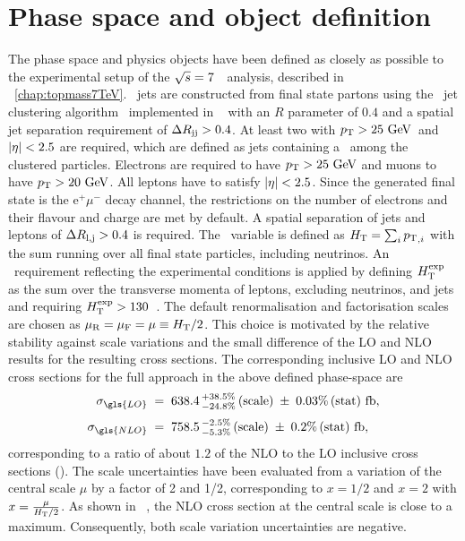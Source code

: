 \section{Phase space and object definition}
%
The phase space and physics objects have been defined as closely as possible to the experimental setup of the ${\sqrt{s}}=7$~\TeV\ analysis, described in \chap~\ref{chap:topmass7TeV}.
%
\Genlevel\ jets are constructed from final state partons using the \antikt\ jet clustering algorithm~\cite{CAC-0801} implemented in \Fastjet~\cite{Cacciari:2011ma} with an $R$ parameter of $0.4$ and a spatial jet separation requirement of $\Delta R_\mathrm{jj}>0.4$. At least two  with $p_\mathrm{T}>25~\mathrm{GeV}$\ and $|\eta|<2.5$ are required, which are defined as jets containing a \bquark\ among the clustered particles. 
%
Electrons are required to have $p_\mathrm{T}>25~\mathrm{GeV}$ and muons to have $p_\mathrm{T}>20~\mathrm{GeV}$. All leptons have to satisfy $|\eta|<2.5$. Since the generated final state is the e$^+\mu^-$ decay channel, the restrictions on the number of electrons and their flavour and charge are met by default. 
%
A spatial separation of jets and leptons of $\Delta R_\mathrm{l,j}>0.4$ is required.
%
%
The \Ht\ variable is defined as $H_{\mathrm{T}}=\sum_i {p_\mathrm{T}}_{,i}$ with the sum running over all final state particles, including neutrinos. An \Ht\ requirement reflecting the experimental conditions is applied by defining $H_{\mathrm{T}}^\mathrm{exp}$ as the sum over the transverse momenta of leptons, excluding neutrinos, and jets and requiring $H_{\mathrm{T}}^\mathrm{exp}>130$~\GeV.
%
The default renormalisation and factorisation scales are chosen as $\mu_\mathrm{R}=\mu_\mathrm{F}=\mu\equiv H_{\mathrm{T}}/2$. This choice is motivated by the relative stability against scale variations and the small difference of the \gls{LO} and \gls{NLO} results for the resulting cross sections.
%
The corresponding inclusive \gls{LO} and \gls{NLO} cross sections for the full approach in the above defined phase-space are 
%
\[
\begin{aligned}
  \sigma_{\gls{LO}} &\;=\; 638.4\,^{+38.5\%}_{-24.8\%}\,(\text{scale})\;\pm\;0.03\%\,(\text{stat})~\fb,\\[1mm]
  \sigma_{\gls{NLO}} &\;=\; 758.5\,^{-2.5\%}_{-5.3\%}\,(\text{scale})\;\pm\;0.2\%\,(\text{stat})~\fb,
\end{aligned}
\]
%
corresponding to a ratio of about $1.2$ of the \gls{NLO} to the \gls{LO} inclusive cross sections (\kfac). The scale uncertainties have been evaluated from a variation of the central scale $\mu$ by a factor of 2 and 1/2, corresponding to $x=1/2$ and $x=2$ with $x=\frac{\mu}{H_{\mathrm{T}}/2}$. As shown in \fig~, the \gls{NLO} cross section at the central scale is close to a maximum. Consequently, both scale variation uncertainties are negative. 
